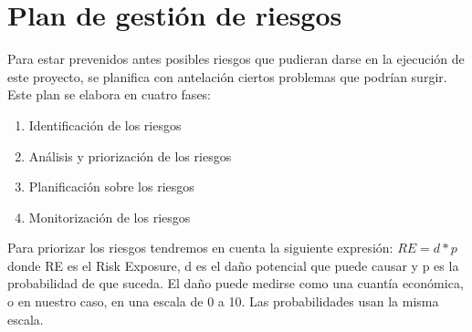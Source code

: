 \documentclass[12pt]{report} %
\begin{document}
\section{Plan de gestión de riesgos}

Para estar prevenidos antes posibles riesgos que pudieran darse en la ejecución de este proyecto, se planifica con antelación ciertos problemas que podrían surgir. Este plan se elabora en cuatro fases:
\begin{enumerate}
    \item Identificación de los riesgos
    \item Análisis y priorización de los riesgos
    \item Planificación sobre los riesgos
    \item Monitorización de los riesgos
\end{enumerate}

Para priorizar los riesgos tendremos en cuenta la siguiente expresión:
\begin{math}
RE = d*p
\end{math}
donde RE es el Risk Exposure, d es el daño potencial que puede causar y p es la probabilidad de que suceda. El daño puede medirse como una cuantía económica, o en nuestro caso, en una escala de 0 a 10. Las probabilidades usan la misma escala.
\end{document}
